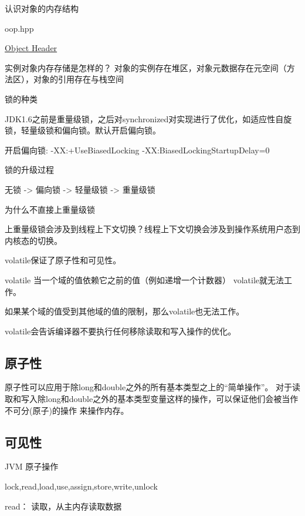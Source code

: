 认识对象的内存结构

oop.hpp

\href{https://gist.github.com/arturmkrtchyan/43d6135e8a15798cc46c}{Object Header}


实例对象内存存储是怎样的？
对象的实例存在堆区，对象元数据存在元空间（方法区），对象的引用存在与栈空间


锁的种类


JDK1.6之前是重量级锁，之后对synchronized对实现进行了优化，如适应性自旋锁，轻量级锁和偏向锁。默认开启偏向锁。

开启偏向锁: -XX:+UseBiasedLocking -XX:BiasedLockingStartupDelay=0

锁的升级过程


无锁 -> 偏向锁 -> 轻量级锁  -> 重量级锁


为什么不直接上重量级锁

上重量级锁会涉及到线程上下文切换？线程上下文切换会涉及到操作系统用户态到内核态的切换。



volatile保证了原子性和可见性。

volatile
当一个域的值依赖它之前的值（例如递增一个计数器） volatile就无法工作。

如果某个域的值受到其他域的值的限制，那么volatile也无法工作。

volatile会告诉编译器不要执行任何移除读取和写入操作的优化。


\subsection{原子性}

原子性可以应用于除long和double之外的所有基本类型之上的“简单操作”。
对于读取和写入除long和double之外的基本类型变量这样的操作，可以保证他们会被当作不可分(原子)的操作
来操作内存。



\subsection{可见性}





JVM 原子操作

lock,read,load,use,assign,store,write,unlock


read： 读取，从主内存读取数据

